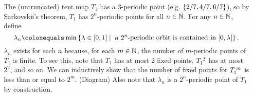 \documentclass[10pt,twoside,draft]{book}
\begin{document}
\begin{example}
  The (untruncated) tent map $T_1$ has a 3-periodic point (e.g. $\left \{ 2/7, 4/7, 6/7 \right \}$), so by Sarkovskii's theorem, $T_1$ has $2^n$-periodic points for all $n \in \mathbb{N}$.
  For any $n \in \mathbb{N}$, define
  \begin{equation*}
    \lambda_n \ceq \min\setst{\lambda \in [0,1]}{\mbox{ a } 2^n\mbox{-periodic orbit is contained in } [0,\lambda]}.
  \end{equation*}
  $\lambda_n$ exists for each $n$ because, for each $m \in \mathbb{N}$, the number of $m$-periodic points of $T_1$ is finite.
  To see this, note that $T_1$ has at most 2 fixed points, $T_1^{\;2}$ has at most $2^2$, and so on. 
  We can inductively show that the number of fixed points for $T_1^{\;m}$ is less than or equal to $2^m$. (Diagram)
  Also note that $\lambda_n$ is a $2^n$-periodic point of $T_1$ by construction.


\end{example}
\end{document}
